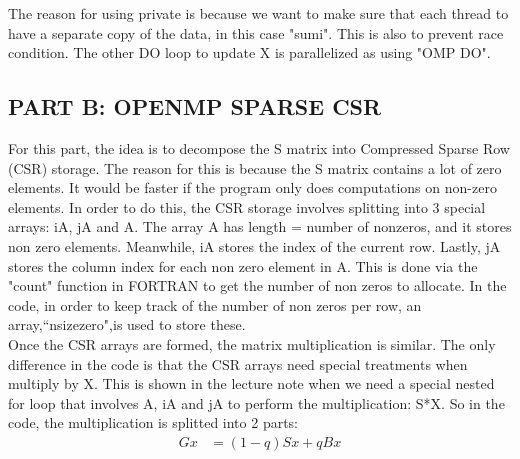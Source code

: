\documentclass[12pt]{article}
\begin{document}
    \noindent
    The reason for using private is because we want to make sure that each thread to have a separate copy of the data, in this case "sumi". This is also to prevent race condition. The other DO loop to update X is parallelized as using "OMP DO".  
    
    \subsection{PART B: OPENMP SPARSE CSR}
    For this part, the idea is to decompose the S matrix into Compressed Sparse Row (CSR) storage. The reason for this is because the S matrix contains a lot of zero elements. It would be faster if the program only does computations on non-zero elements. In order to do this, the CSR storage involves splitting into 3 special arrays: iA, jA and A. The array A has length = number of nonzeros, and it stores non zero elements. Meanwhile, iA stores the index of the current row. Lastly, jA stores the column index for each non zero element in A. This is done via the "count" function in FORTRAN to get the number of non zeros to allocate.  In the code, in order to keep track of the number of non zeros per row, an array,``nsizezero",is used to store these. \\
    \noindent
    Once the CSR arrays are formed, the matrix multiplication is similar. The only difference in the code is that the CSR arrays need special treatments when multiply by X. This is shown in the lecture note when we need a special nested for loop that involves A, iA and jA to perform the multiplication: S*X.  So in the code, the multiplication is splitted into 2 parts:
    \begin{align*}
        Gx &= (1-q)Sx  + qBx      
    \end{align*}
\end{document}
